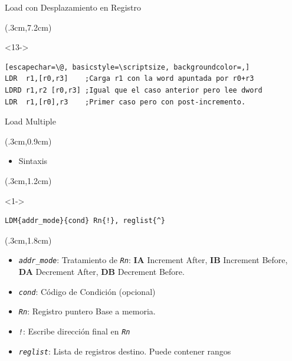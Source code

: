 \documentclass[usenames,table,dvipsnames,aspectratio=169]{beamer}
\begin{document}
\begin{frame}[fragile]{Load con Desplazamiento en Registro}
\begin{textblock*}{\textwidth}
 \end{textblock*}
 \begin{textblock*}{\textwidth}(.3cm,7.2cm)
  \begin{onlyenv}<13->
   \begin{lstlisting}[escapechar=\@, basicstyle=\scriptsize, backgroundcolor=,]
LDR  r1,[r0,r3]    ;Carga r1 con la word apuntada por r0+r3
LDRD r1,r2 [r0,r3] ;Igual que el caso anterior pero lee dword
LDR  r1,[r0],r3    ;Primer caso pero con post-incremento.
   \end{lstlisting}
  \end{onlyenv}
 \end{textblock*}
\end{frame}

\begin{frame}[fragile]{Load Multiple}
 \begin{textblock*}{\textwidth}(.3cm,0.9cm)
  \begin{itemize}
   \item Sintaxis
  \end{itemize}
 \end{textblock*}
 \begin{footnotesize}
  \begin{textblock*}{\textwidth}(.3cm,1.2cm)
    \begin{onlyenv}<1->
    \begin{verbatim}
LDM{addr_mode}{cond} Rn{!}, reglist{^}
    \end{verbatim}
   \end{onlyenv}
  \end{textblock*}
  \begin{textblock*}{\textwidth}(.3cm,1.8cm)
   \begin{itemize}[<+(1)->]
    \item [] \textit{\texttt{addr\_mode}}: Tratamiento de \textit{\texttt{Rn}}: \textbf{IA} Increment After, \textbf{IB} Increment Before, \textbf{DA} Decrement After, \textbf{DB} Decrement Before.
    \item [] \texttt{\textit{cond}}: Código de Condición (opcional)
    \item [] \textit{\texttt{Rn}}: Registro puntero Base a memoria.
    \item [] \texttt{\textit{!}}: Escribe dirección final en \textit{\texttt{Rn}}
    \item [] \textit{\texttt{reglist}}: Lista de registros destino. Puede contener rangos
   \end{itemize}
  \end{textblock*}

\end{footnotesize}
\end{frame}
\end{document}

